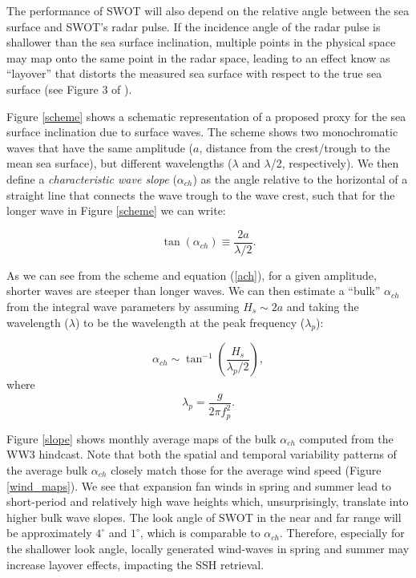 The performance of SWOT will also depend on the relative angle between the sea surface and SWOT's radar pulse. If the incidence angle of the radar pulse is shallower than the sea surface inclination, multiple points in the physical space may map onto the same point in the radar space, leading to an effect know as ``layover'' that distorts the measured sea surface with respect to the true sea surface (see Figure 3 of \cite{peral2015impact}).


Figure \ref{scheme} shows a schematic representation of a proposed proxy for the sea surface inclination due to surface waves. The scheme shows two monochromatic waves that have the same amplitude ($a$, distance from the crest/trough to the mean sea surface), but different wavelengths ($\lambda$ and $\lambda$/2, respectively). We then define a \textit{characteristic wave slope} ($\alpha_{ch}$) as the angle relative to the horizontal of a straight line that connects the wave trough to the wave crest, such that for the longer wave in Figure \ref{scheme} we can write: 

\begin{equation}
\tan{(\alpha_{ch})} \equiv \frac{2a}{\lambda /2}.
\label{ach}
\end{equation}

\noindent As we can see from the scheme and equation (\ref{ach}), for a given amplitude, shorter waves are steeper than longer waves. We can then estimate a ``bulk'' $\alpha_{ch}$ from the integral wave parameters by assuming $H_s \sim 2a$ and taking the wavelength ($\lambda$) to be the wavelength at the peak frequency ($\lambda_p$):

\begin{equation}
\alpha_{ch} \sim \tan^{-1}\left( \frac{H_s}{\lambda_p /2}\right), 
\end{equation}
\noindent where
\begin{equation}
\lambda_p = \frac{g}{2\pi f^2_p}.
\end{equation}


Figure \ref{slope} shows monthly average maps of the bulk $\alpha_{ch}$ computed from the WW3 hindcast. Note that both the spatial and temporal variability patterns of the average bulk $\alpha_{ch}$ closely match those for the average wind speed (Figure \ref{wind_maps}). We see that expansion fan winds in spring and summer lead to short-period and relatively high wave heights which, unsurprisingly, translate into higher bulk wave slopes. The look angle of SWOT in the near and far range will be approximately $4^\circ$ and $1^\circ$, which is comparable to $\alpha_{ch}$. Therefore, especially for the shallower look angle, locally generated wind-waves in spring and summer may increase layover effects, impacting the SSH retrieval.
 
